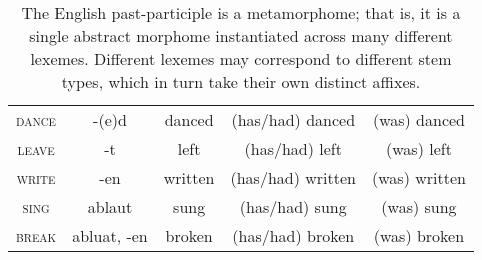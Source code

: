 {\begin{table}[ht]
\begin{tabular}{c c c c c}
\midrule
\textsc{dance} & -(e)d & danced & (has/had) danced & (was) danced \\
\textsc{leave} & -t & left & (has/had) left & (was) left \\ 
\textsc{write} & -en & written & (has/had) written & (was) written \\
\textsc{sing} & ablaut & sung & (has/had) sung & (was) sung \\
\textsc{break} & abluat, -en & broken & (has/had) broken & (was) broken \\
\bottomrule
\end{tabular}
\label{tab:engpastpart}
\caption{The English past-participle is a metamorphome; that is, it is a single abstract morphome instantiated across many different lexemes. Different lexemes may correspond to different stem types, which in turn take their own distinct affixes.}
\end{table}

}
